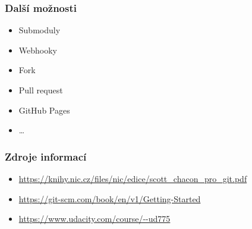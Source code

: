 \documentclass[10pt, compress]{beamer}
\begin{document}
\begin{frame}[fragile]
\frametitle{Další možnosti}
	\begin{itemize}
        \item Submoduly
        \item Webhooky
        \item Fork
        \item Pull request
        \item GitHub Pages
        \item \dots

	\end{itemize}
\end{frame}








\begin{frame}[fragile]
\frametitle{Zdroje informací}
  \begin{itemize}
    \item \url{https://knihy.nic.cz/files/nic/edice/scott_chacon_pro_git.pdf}
    \item \url{https://git-scm.com/book/en/v1/Getting-Started}
    \item \url{https://www.udacity.com/course/--ud775}
  \end{itemize}
\end{frame}


\end{document}
